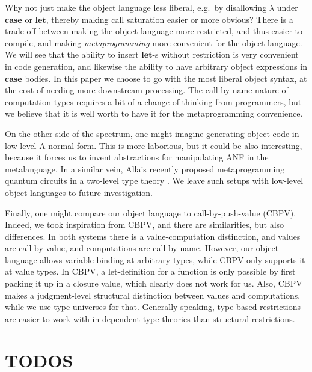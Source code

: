 \documentclass[acmsmall,screen,review,anonymous]{acmart}
\newcommand{\mbf}[1]{\mathbf{#1}}
\begin{document}
Why not just make the object language less liberal, e.g.\ by disallowing
$\lambda$ under $\mbf{case}$ or $\mbf{let}$, thereby making call saturation
easier or more obvious? There is a trade-off between making the object language
more restricted, and thus easier to compile, and making \emph{metaprogramming}
more convenient for the object language. We will see that the ability to insert
$\mbf{let}$-s without restriction is very convenient in code generation, and
likewise the ability to have arbitrary object expressions in $\mbf{case}$
bodies. In this paper we choose to go with the most liberal object syntax, at
the cost of needing more downstream processing. The call-by-name nature of
computation types requires a bit of a change of thinking from programmers, but
we believe that it is well worth to have it for the metaprogramming convenience.

On the other side of the spectrum, one might imagine generating object code in
low-level A-normal form. This is more laborious, but it could be also
interesting, because it forces us to invent abstractions for manipulating ANF in
the metalanguage. In a similar vein, Allais recently proposed metaprogramming
quantum circuits in a two-level type theory \cite{TODO}. We leave such setups
with low-level object languages to future investigation.

Finally, one might compare our object language to call-by-push-value
(CBPV). Indeed, we took inspiration from CBPV, and there are similarities, but
also differences. In both systems there is a value-computation distinction, and
values are call-by-value, and computations are call-by-name. However, our object
language allows variable binding at arbitrary types, while CBPV only supports it
at value types. In CBPV, a let-definition for a function is only possible by
first packing it up in a closure value, which clearly does not work for us.
Also, CBPV makes a judgment-level structural distinction between values and
computations, while we use type universes for that. Generally speaking,
type-based restrictions are easier to work with in dependent type theories than
structural restrictions.


\section{TODOS}

\end{document}
